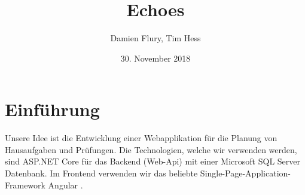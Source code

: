 \documentclass[a4paper, titlepage]{article}
\title{Echoes}
\author{Damien Flury, Tim Hess}
\date{30. November 2018}
\begin{document}
    \maketitle
    \tableofcontents
    \newpage

    \section{Einführung}
    Unsere Idee ist die Entwicklung einer Webapplikation für die Planung von Hausaufgaben
    und Prüfungen. Die Technologien, welche wir verwenden werden, sind ASP.NET Core \cite{Dotnet}
    für das Backend (Web-Api) mit einer Microsoft SQL Server Datenbank. Im Frontend 
    verwenden wir das beliebte Single-Page-Application-Framework Angular \cite{Angular}.
    
    \newpage
    \printbibliography
\end{document}
